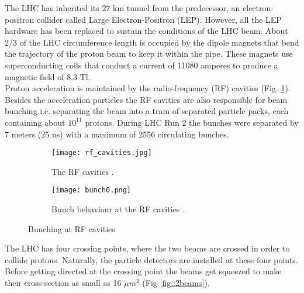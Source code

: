      The LHC has inherited its 27 km tunnel from the predecessor, an electron-positron collider called Large Electron-Positron (LEP). However, all the LEP hardware has been replaced to sustain the conditions of the LHC beam. About 2/3 of the LHC circumference length is occupied by the dipole magnets that bend the trajectory of the proton beam to keep it within the pipe. These magnets use superconducting coils that conduct a current of 11080 amperes to produce a magnetic field of 8.3 Tl.\\
     Proton acceleration is maintained by the radio-frequency (RF) cavities (Fig. \ref{fig::rf_cavities}). Besides the acceleration particles the RF cavities are also responsible for beam bunching i.e. separating the beam into a train of separated particle packs, each containing about $10^{11}$ protons. During LHC Run 2 the bunches were separated by 7 meters (25 ns) with a maximum of 2556 circulating bunches.
	\begin{figure}[htbp]
	\begin{subfigure}[t]{0.48\textwidth}
		\texttt{[image: rf\_cavities.jpg]}
		\caption[RF Cavities]{The RF cavities \cite{rf_cavities}.}
		\label{fig::rf_cavities}
	\end{subfigure}
	\hfill
	\begin{subfigure}[t]{0.48\textwidth}
		\texttt{[image: bunch0.png]}
		\caption[Beam pipes]{Bunch behaviour at the RF cavities \cite{Wilson:513326}.}
		\label{fig::bunching}
	\end{subfigure}
	\caption{Bunching at RF cavities}
	\label{fig::bunch_at_rf}
\end{figure}
	The LHC has four crossing points, where the two beams are crossed in order to collide protons. Naturally, the particle detectors are installed at these four points. Before getting directed at the crossing point the beams get squeezed to make their cross-section as small as 16 $\mu m^2$ (Fig \ref{fig::2beams}).  	

